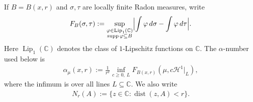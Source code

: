 \documentclass[11pt,a4paper,english,reqno]{amsart}
\newcommand{\hd}[1]{\mathcal{H}^{#1}}
\numberwithin{equation}{section}
\newcommand{\CC}[0]{\mathbb{C}}
\renewcommand{\subset}{\subseteq}
\DeclareMathOperator{\supp}{supp}
\DeclareMathOperator{\dist}{dist}
\DeclarePairedDelimiter{\abs}{\lvert}{\rvert}
\renewcommand{\restriction}{\big|}
\numberwithin{definition}{section}
\begin{document}
If $B=B(x,r)$ and $\sigma,\tau$ are locally finite Radon measures, write
\begin{align}\label{eq:F-B}
  F_B(\sigma,\tau)
  :=
  \sup_{\substack{\varphi\in \operatorname{Lip}_1(\CC)\\ \supp\varphi\subset B}}
  \abs[\Big]{\int \varphi\,d\sigma-\int\varphi\,d\tau} .
\end{align}
Here $\operatorname{Lip}_1(\CC)$ denotes the class of $1$-Lipschitz functions on $\CC$.
The $\alpha$-number used below is
\begin{align}\label{eq:appendix-line-alpha}
  \alpha_{\mu}(x,r)
  :=
  \frac{1}{r^2}
  \inf_{c\ge0,\ L}
  F_{B(x,r)}\left(\mu,c\hd1\restriction_L\right),
\end{align}
where the infimum is over all lines $L\subset\CC$.  We also write
\begin{align}
  N_r(A):=\{z\in\CC:\dist(z,A)<r\}.
\end{align}
\end{document}
